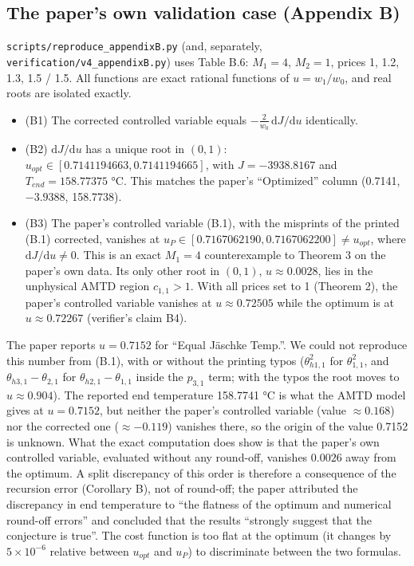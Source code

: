 \documentclass[11pt,a4paper]{report}
\begin{document}
\subsection{The paper's own validation case (Appendix B)}\label{sec:appB}

\texttt{scripts/reproduce\_appendixB.py} (and, separately, \texttt{verification/v4\_appendixB.py}) uses Table B.6:
\(M_1 = 4\), \(M_2 = 1\), prices 1, 1.2, 1.3, 1.5 / 1.5. All functions are exact rational functions of
\(u = w_1/w_0\), and real roots are isolated exactly.
\begin{itemize}
\item (B1) The corrected controlled variable equals \(-\frac{2}{w_0}\,\mathrm{d}J/\mathrm{d}u\) identically.
\item (B2) \(\mathrm{d}J/\mathrm{d}u\) has a unique root in \((0,1)\): \(u_{opt} \in [0.7141194663, 0.7141194665]\),
with \(J = -3938.8167\) and \(T_{end} = 158.77375\) °C. This matches the paper's ``Optimized'' column (0.7141, \(-3.9388\),
158.7738).
\item (B3) The paper's controlled variable (B.1), with the misprints of the printed (B.1) corrected, vanishes at
\(u_P \in [0.7167062190, 0.7167062200] \ne u_{opt}\), where \(\mathrm{d}J/\mathrm{d}u \ne 0\). This is an exact
\(M_1 = 4\) counterexample to Theorem 3 on the paper's own data. Its only other root in \((0,1)\),
\(u \approx 0.0028\), lies in the unphysical AMTD region \(c_{1,1} > 1\). With all prices set to 1 (Theorem 2), the
paper's controlled variable vanishes at \(u \approx 0.72505\) while the optimum is at \(u \approx 0.72267\)
(verifier's claim B4).
\end{itemize}

The paper reports \(u = 0.7152\) for ``Equal Jäschke Temp.''. We could not reproduce this number from (B.1), with or
without the printing typos (\(\theta^2_{h1,1}\) for \(\theta^2_{1,1}\), and \(\theta_{h3,1}-\theta_{2,1}\) for
\(\theta_{h2,1}-\theta_{1,1}\) inside the \(p_{3,1}\) term; with the typos the root moves to \(u \approx 0.904\)). The
reported end temperature 158.7741 °C is what the AMTD model gives at \(u = 0.7152\), but neither the paper's controlled
variable (value \(\approx 0.168\)) nor the corrected one (\(\approx -0.119\)) vanishes there, so the origin of the
value 0.7152 is unknown. What the exact computation does show is that the paper's own controlled variable, evaluated
without any round-off, vanishes \(0.0026\) away from the optimum. A split discrepancy of this order is therefore a
consequence of the recursion error (Corollary B), not of round-off; the paper attributed the discrepancy in end
temperature to ``the flatness of the optimum and numerical round-off errors'' and concluded that the results ``strongly
suggest that the conjecture is true''. The cost function is too flat at the optimum (it changes by \(5\times10^{-6}\)
relative between \(u_{opt}\) and \(u_P\)) to discriminate between the two formulas.
\end{document}
